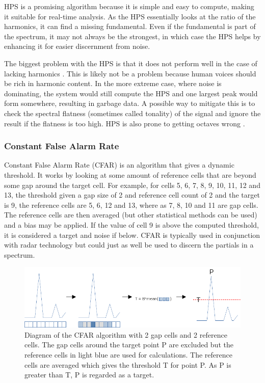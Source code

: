 HPS is a promising algorithm because it is simple and easy to compute, making it suitable for real-time analysis. As the HPS essentially looks at the ratio of the harmonics, it can find a missing fundamental. Even if the fundamental is part of the spectrum, it may not always be the strongest, in which case the HPS helps by enhancing it for easier discernment from noise.

The biggest problem with the HPS is that it does not perform well in the case of lacking harmonics \cite{McLeod2008}. This is likely not be a problem because human voices should be rich in harmonic content. In the more extreme case, where noise is dominating, the system would still compute the HPS and one largest peak would form somewhere, resulting in garbage data. A possible way to mitigate this is to check the spectral flatness (sometimes called tonality) of the signal and ignore the result if the flatness is too high. HPS is also prone to getting octaves wrong \cite{Smyth2019}.
\subsubsection{Constant False Alarm Rate}
Constant False Alarm Rate (CFAR) is an algorithm that gives a dynamic threshold. It works by looking at some amount of reference cells that are beyond some gap around the target cell. For example, for cells 5, 6, 7, 8, 9, 10, 11, 12 and 13, the threshold given a gap size of 2 and reference cell count of 2 and the target is 9, the reference cells are 5, 6, 12 and 13, where as 7, 8, 10 and 11 are gap cells. The reference cells are then averaged (but other statistical methods can be used) and a bias may be applied. If the value of cell 9 is above the computed threshold, it is considered a target and noise if below. CFAR is typically used in conjunction with radar technology but could just as well be used to discern the partials in a spectrum. 

\begin{figure}[ht]
    \centering
    \includegraphics[width=\textwidth]{./images/cfar.png}
    \caption{Diagram of the CFAR algorithm with 2 gap cells and 2 reference cells. The gap cells around the target point P are excluded but the reference cells in light blue are used for calculations. The reference cells are averaged which gives the threshold T for point P. As P is greater than T, P is regarded as a target.\label{fig:cfar}}
\end{figure}

